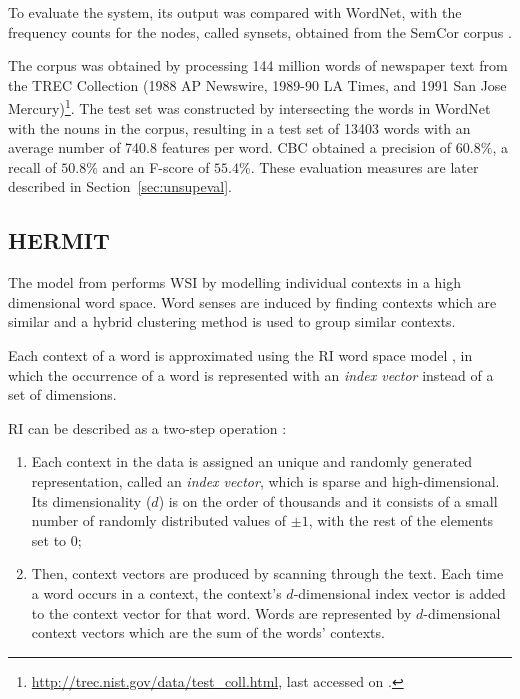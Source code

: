 To evaluate the system, its output was compared with WordNet, with the
frequency counts for the nodes, called synsets, obtained from the SemCor corpus 
\citep{miller1993semantic}.

The corpus was obtained by processing 144 million words of newspaper text from 
the TREC Collection (1988 AP Newswire, 1989-90 LA Times, and 1991 San Jose 
Mercury)\footnote{\url{http://trec.nist.gov/data/test_coll.html}, last 
accessed on .}. The test set was constructed by 
intersecting the words in WordNet 
with the nouns in the corpus, resulting in a test set of 13403 words with an 
average number of 740.8 features per word. \ac{CBC} obtained a precision of 
$60.8\%$, a recall of $50.8\%$ and an F-score of $55.4\%$. These evaluation 
measures are later described in Section~\ref{sec:unsupeval}.

\subsection{HERMIT}

The model from \citet{jurgens2010hermit} performs \ac{WSI} by modelling 
individual contexts in a high dimensional word space. Word senses are induced 
by finding contexts which are similar and a hybrid clustering method is used to 
group similar contexts.

Each context of a word is approximated using the \ac{RI} word space model
\citep{kanerva2000random}, in which the occurrence of a word is represented with
an \textit{index vector} instead of a set of dimensions.

\ac{RI} can be described as a two-step operation
\citep{sahlgren2005introduction}:

\begin{enumerate}
 \item Each context in the data is assigned an unique and randomly generated
 representation, called an \textit{index vector}, which is sparse and
 high-dimensional. Its dimensionality ($d$) is on the order of thousands and
 it consists of a small number of randomly distributed values of $\pm1$, with 
 the rest of the elements set to $0$;
 \item Then, context vectors are produced by scanning through the text. Each
 time a word occurs in a context, the context's $d$-dimensional index vector is
 added to the context vector for that word. Words are represented by
 $d$-dimensional context vectors which are the sum of the words' contexts.
\end{enumerate}

